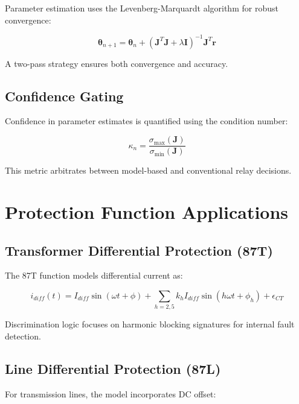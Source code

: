 \documentclass[10pt]{article}
\begin{document}
Parameter estimation uses the Levenberg-Marquardt algorithm for robust convergence:

\begin{equation}
\boldsymbol{\theta}_{n+1} = \boldsymbol{\theta}_n + (\mathbf{J}^T\mathbf{J} + \lambda \mathbf{I})^{-1} \mathbf{J}^T \mathbf{r}
\label{eq:lm}
\end{equation}

A two-pass strategy ensures both convergence and accuracy.

\subsection{Confidence Gating}

Confidence in parameter estimates is quantified using the condition number:

\begin{equation}
\kappa_n = \frac{\sigma_{\max}(\mathbf{J})}{\sigma_{\min}(\mathbf{J})}
\label{eq:condition}
\end{equation}

This metric arbitrates between model-based and conventional relay decisions.

\section{Protection Function Applications}
\label{sec:applications}

\subsection{Transformer Differential Protection (87T)}

The 87T function models differential current as:

\begin{equation}
i_{diff}(t) = I_{diff} \sin(\omega t + \phi) + \sum_{h=2,5} k_h I_{diff} \sin(h\omega t + \phi_h) + \epsilon_{CT}
\label{eq:87t}
\end{equation}

Discrimination logic focuses on harmonic blocking signatures for internal fault detection.

\subsection{Line Differential Protection (87L)}

For transmission lines, the model incorporates DC offset:
\end{document}
